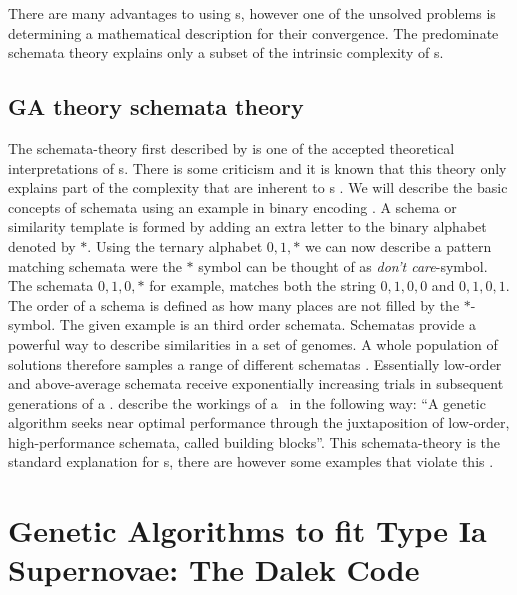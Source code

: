 There are many advantages to using \ga s, however one of the unsolved problems is determining a mathematical description for their convergence. The predominate schemata theory explains only a subset of the intrinsic complexity of \ga s.

\subsection{GA theory schemata theory}

The schemata-theory first described by \cite{holland1975} is one of the accepted theoretical interpretations of \ga s. There is some criticism and it is known that this theory only explains part of the complexity that are inherent to \ga s \citep[see ][ and references therein]{Whitley94agenetic}. We will describe the basic concepts of schemata using an example in binary encoding \citep[notation adapted from ][]{citeulike:125978}. A schema or similarity template is formed by adding an extra letter to the binary alphabet denoted by $*$. Using the ternary alphabet ${0, 1, *}$ we can now describe a pattern matching schemata were the $*$ symbol can be thought of as \textit{don't care}-symbol. The schemata ${0, 1, 0, *}$ for example, matches both the string ${0, 1, 0, 0}$ and ${0, 1, 0, 1}$. The order of a schema is defined as how many places are not filled by the $*$-symbol. The given example is an third order schemata. Schematas provide a powerful way to describe similarities in a set of genomes. 
A whole population of solutions therefore samples a range of different schematas . Essentially low-order and above-average schemata receive exponentially increasing trials in subsequent generations of a \ga. \citet{Michalewicz:1994:GAD:184675} describe the workings of a \ga\ in the following way: ``A genetic algorithm seeks near optimal performance through the juxtaposition of low-order, high-performance schemata, called building blocks''.
This schemata-theory is the standard explanation for \ga s, there are however some examples that violate this \citep[see chapter 3 of][for some examples]{Michalewicz:1994:GAD:184675}.


\section{Genetic Algorithms to fit Type Ia Supernovae: The Dalek Code}
\label{sec:geneticdalek}

